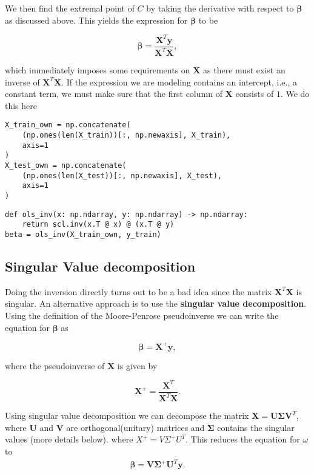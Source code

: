 \documentclass[%
oneside,                 %
final,                   %
10pt]{article}
\begin{document}
We then find the extremal point of $C$ by taking the derivative with respect to $\bm{\beta}$ as discussed above.
This yields the expression for $\bm{\beta}$ to be

\[
    \bm{\beta} = \frac{\bm{X}^T \bm{y}}{\bm{X}^T \bm{X}},
\]

which immediately imposes some requirements on $\bm{X}$ as there must exist
an inverse of $\bm{X}^T \bm{X}$. If the expression we are modeling contains an
intercept, i.e., a constant term, we must make sure that the
first column of $\bm{X}$ consists of $1$. We do this here

\begin{verbatim}
X_train_own = np.concatenate(
    (np.ones(len(X_train))[:, np.newaxis], X_train),
    axis=1
)
X_test_own = np.concatenate(
    (np.ones(len(X_test))[:, np.newaxis], X_test),
    axis=1
)
\end{verbatim}

\begin{verbatim}
def ols_inv(x: np.ndarray, y: np.ndarray) -> np.ndarray:
    return scl.inv(x.T @ x) @ (x.T @ y)
beta = ols_inv(X_train_own, y_train)
\end{verbatim}


\subsection*{Singular Value decomposition}

Doing the inversion directly turns out to be a bad idea since the matrix
$\bm{X}^T\bm{X}$ is singular. An alternative approach is to use the \textbf{singular
value decomposition}. Using the definition of the Moore-Penrose
pseudoinverse we can write the equation for $\bm{\beta}$ as

\[
    \bm{\beta} = \bm{X}^{+}\bm{y},
\]

where the pseudoinverse of $\bm{X}$ is given by

\[
    \bm{X}^{+} = \frac{\bm{X}^T}{\bm{X}^T\bm{X}}.
\]

Using singular value decomposition we can decompose the matrix  $\bm{X} = \bm{U}\bm{\Sigma} \bm{V}^T$,
where $\bm{U}$ and $\bm{V}$ are orthogonal(unitary) matrices and $\bm{\Sigma}$ contains the singular values (more details below).
where $X^{+} = V\Sigma^{+} U^T$. This reduces the equation for
$\omega$ to
\begin{align}
    \bm{\beta} = \bm{V}\bm{\Sigma}^{+} \bm{U}^T \bm{y}.
\end{align}
\end{document}
